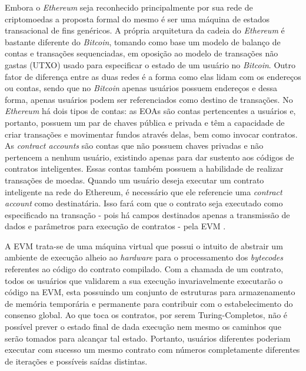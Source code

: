%
Embora o \textit{Ethereum} seja reconhecido principalmente por sua rede de criptomoedas a proposta formal do mesmo é ser uma máquina de estados transacional de fins genéricos. A própria arquitetura da cadeia do \textit{Ethereum} é bastante diferente do \textit{Bitcoin}, tomando como base um modelo de balanço de contas e transações sequenciadas, em oposição ao modelo de transações não gastas (\ac{UTXO}) usado para especificar o estado de um usuário no \textit{Bitcoin}. Outro fator de diferença entre as duas redes é a forma como elas lidam com os endereços ou contas, sendo que no \textit{Bitcoin} apenas usuários possuem endereços e dessa forma, apenas usuários podem ser referenciados como destino de transações. No \textit{Ethereum} há dois tipos de contas: as \acp{EOA} são contas pertencentes a usuários e, portanto, possuem um par de chaves pública e privada e têm a capacidade de criar transações e movimentar fundos através delas, bem como invocar contratos. As \textit{contract accounts} são contas que não possuem chaves privadas e não pertencem a nenhum usuário, existindo apenas para dar sustento aos códigos de contratos inteligentes. Essas contas também possuem a habilidade de realizar transações de moedas. Quando um usuário deseja executar um contrato inteligente na rede do Ethereum, é necessário que ele referencie uma \textit{contract account} como destinatária. Isso fará com que o contrato seja executado como especificado na transação - pois há campos destinados apenas a transmissão de dados e parâmetros para execução de contratos - pela \ac{EVM} \cite{blockchain:mastering_ethereum}.

%
A \ac{EVM} trata-se de uma máquina virtual que possui o intuito de abstrair um ambiente de execução alheio ao \textit{hardware} para o processamento dos \textit{bytecodes} referentes ao código do contrato compilado. Com a chamada de um contrato, todos os usuários que validarem a sua execução invariavelmente executarão o código na \ac{EVM}, esta possuindo um conjunto de estruturas para armazenamento de memória temporária e permanente para contribuir com o estabelecimento do consenso global.
%
Ao que toca os contratos, por serem Turing-Completos, não é possível prever o estado final de dada execução nem mesmo os caminhos que serão tomados para alcançar tal estado. 
%
Portanto, usuários diferentes poderiam executar com sucesso um mesmo contrato com números completamente diferentes de iterações e possíveis saídas distintas.

